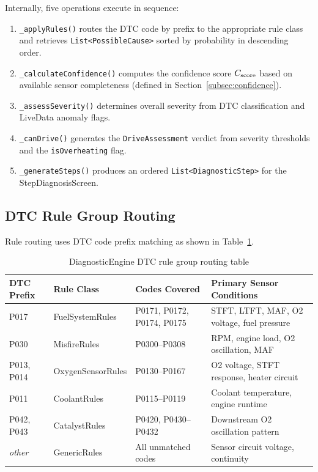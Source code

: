 Internally, five operations execute in sequence:
\begin{enumerate}
  \item \texttt{\_applyRules()} routes the DTC code by prefix to the appropriate rule class and retrieves \texttt{List<PossibleCause>} sorted by probability in descending order.
  \item \texttt{\_calculateConfidence()} computes the confidence score $C_{\mathrm{score}}$ based on available sensor completeness (defined in Section~\ref{subsec:confidence}).
  \item \texttt{\_assessSeverity()} determines overall severity from DTC classification and LiveData anomaly flags.
  \item \texttt{\_canDrive()} generates the \texttt{DriveAssessment} verdict from severity thresholds and the \texttt{isOverheating} flag.
  \item \texttt{\_generateSteps()} produces an ordered \texttt{List<DiagnosticStep>} for the StepDiagnosisScreen.
\end{enumerate}


\subsection{DTC Rule Group Routing}

Rule routing uses DTC code prefix matching as shown in Table~\ref{tab:rule_groups}.

\begin{table}[!htbp]
\centering
\caption{DiagnosticEngine DTC rule group routing table}
\label{tab:rule_groups}
\begin{tabularx}{0.98\linewidth}{p{2.4cm} p{3.4cm} p{3.2cm} X}
\toprule
\rowcolor{tblhdr}
\color{white}\textbf{DTC Prefix} &
\color{white}\textbf{Rule Class} &
\color{white}\textbf{Codes Covered} &
\color{white}\textbf{Primary Sensor Conditions} \\
\midrule
P017           & FuelSystemRules    & P0171, P0172, P0174, P0175 & STFT, LTFT, MAF, O2 voltage, fuel pressure \\
P030           & MisfireRules       & P0300--P0308               & RPM, engine load, O2 oscillation, MAF \\
P013, P014     & OxygenSensorRules  & P0130--P0167               & O2 voltage, STFT response, heater circuit \\
P011           & CoolantRules       & P0115--P0119               & Coolant temperature, engine runtime \\
P042, P043     & CatalystRules      & P0420, P0430--P0432        & Downstream O2 oscillation pattern \\
\textit{other} & GenericRules       & All unmatched codes        & Sensor circuit voltage, continuity \\
\bottomrule
\end{tabularx}
\end{table}

